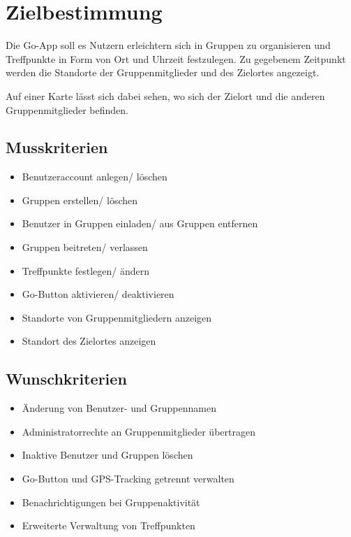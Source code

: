 \section{Zielbestimmung}
Die Go-App soll es Nutzern erleichtern sich in Gruppen zu organisieren
und Treffpunkte in Form von Ort und Uhrzeit festzulegen. Zu gegebenem Zeitpunkt werden die Standorte der Gruppenmitglieder und des Zielortes angezeigt.


Auf einer Karte lässt sich dabei sehen, wo sich der Zielort und die anderen Gruppenmitglieder befinden.

\subsection{Musskriterien}
\begin{itemize}
	\item Benutzeraccount anlegen/ löschen
	\item Gruppen erstellen/ löschen
	\item Benutzer in Gruppen einladen/ aus Gruppen entfernen
	\item Gruppen beitreten/ verlassen
	\item Treffpunkte festlegen/ ändern
	\item Go-Button aktivieren/ deaktivieren
	\item Standorte von Gruppenmitgliedern anzeigen
	\item Standort des Zielortes anzeigen
\end{itemize}

\subsection{Wunschkriterien}
\begin{itemize}
	\item Änderung von Benutzer- und Gruppennamen
	\item Administratorrechte an Gruppenmitglieder übertragen
	\item Inaktive Benutzer und Gruppen löschen
	\item Go-Button und GPS-Tracking getrennt verwalten
	\item Benachrichtigungen bei Gruppenaktivität
	\item Erweiterte Verwaltung von Treffpunkten
\end{itemize}

